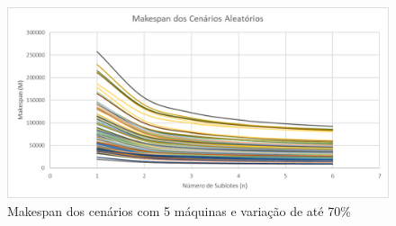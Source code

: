 \begin{figure}[!ht]
    \centering
    \includegraphics[width=12cm]{Resultados/Figuras/M05_70}
    \caption{Makespan dos cenários com 5 máquinas e variação de até 70\%}
    \label{fig:M05_70}
\end{figure}